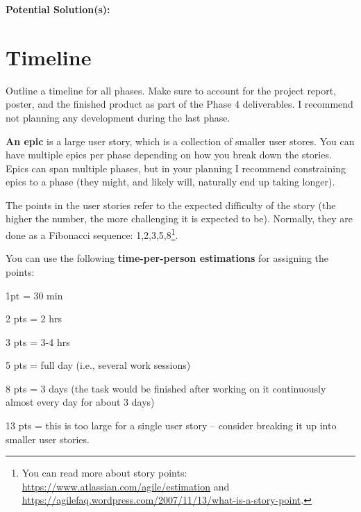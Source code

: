 \documentclass{article}
\begin{document}
   \textbf{Potential Solution(s): }




\section{Timeline}
Outline a timeline for all phases.
Make sure to account for the project report, poster, and the finished product as part of the Phase 4 deliverables.
I recommend not planning any development during the last phase.

\textbf{An epic} is a large user story, which is a collection of smaller user stores.
You can have multiple epics per phase depending on how you break down the stories. 
Epics can span multiple phases, but in your planning I recommend constraining epics to a phase (they might, and likely will, naturally end up taking longer).

The points in the user stories refer to the expected difficulty of the story (the higher the number, the more challenging it is expected to be). Normally, they are done as a Fibonacci sequence: 1,2,3,5,8\footnote{You can read more about story points:
\url{https://www.atlassian.com/agile/estimation} and \url{https://agilefaq.wordpress.com/2007/11/13/what-is-a-story-point}.}.

You can use the following \textbf{time-per-person estimations} for assigning the points:

1pt = 30 min

2 pts = 2 hrs 

3 pts = 3-4 hrs

5 pts = full day (i.e., several work sessions)

8 pts = 3 days (the task would be finished after working on it continuously almost every day for about 3 days)

13 pts = this is too large for a single user story -- consider breaking it up into smaller user stories.
\\
\end{document}
